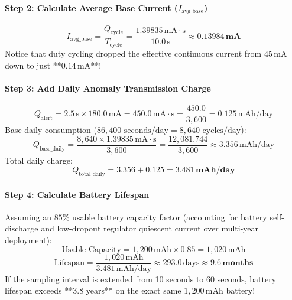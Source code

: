 \begin{example}
\paragraph{Step 2: Calculate Average Base Current ($I_{\text{avg\_base}}$)}
\begin{equation*}
I_{\text{avg\_base}} = \frac{Q_{\text{cycle}}}{T_{\text{cycle}}} = \frac{1.39835\,\text{mA}\cdot\text{s}}{10.0\,\text{s}} \approx \mathbf{0.13984\,\text{mA}}
\end{equation*}
Notice that duty cycling dropped the effective continuous current from $45\,\text{mA}$ down to just **$0.14\,\text{mA}$**!

\paragraph{Step 3: Add Daily Anomaly Transmission Charge}
\begin{equation*}
Q_{\text{alert}} = 2.5\,\text{s} \times 180.0\,\text{mA} = 450.0\,\text{mA}\cdot\text{s} = \frac{450.0}{3{,}600} = 0.125\,\text{mAh/day}
\end{equation*}
Base daily consumption ($86{,}400 \text{ seconds/day} = 8{,}640 \text{ cycles/day}$):
\begin{equation*}
Q_{\text{base\_daily}} = \frac{8{,}640 \times 1.39835\,\text{mA}\cdot\text{s}}{3{,}600} = \frac{12{,}081.744}{3{,}600} \approx 3.356\,\text{mAh/day}
\end{equation*}
Total daily charge:
\begin{equation*}
Q_{\text{total\_daily}} = 3.356 + 0.125 = \mathbf{3.481\,\text{mAh/day}}
\end{equation*}

\paragraph{Step 4: Calculate Battery Lifespan}
Assuming an $85\%$ usable battery capacity factor (accounting for battery self-discharge and low-dropout regulator quiescent current over multi-year deployment):
\begin{equation*}
\text{Usable Capacity} = 1{,}200\,\text{mAh} \times 0.85 = 1{,}020\,\text{mAh}
\end{equation*}
\begin{equation*}
\text{Lifespan} = \frac{1{,}020\,\text{mAh}}{3.481\,\text{mAh/day}} \approx 293.0\,\text{days} \approx \mathbf{9.6\,\text{months}}
\end{equation*}
If the sampling interval is extended from 10 seconds to 60 seconds, battery lifespan exceeds **3.8 years** on the exact same $1{,}200\,\text{mAh}$ battery!
\end{example}

